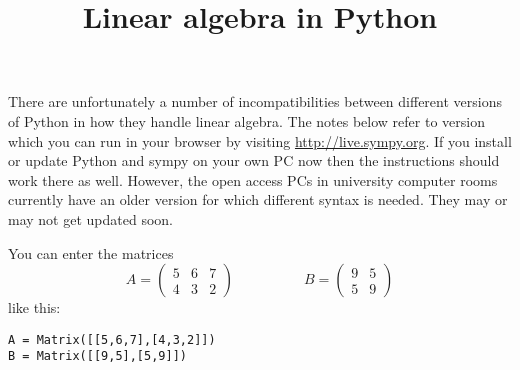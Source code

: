 \documentclass{amsart}
\title{Linear algebra in Python}
\begin{document}
\maketitle

There are unfortunately a number of incompatibilities between
different versions of Python  in how they handle linear algebra.  The
notes below refer to version which you can run in your browser by
visiting \url{http://live.sympy.org}.  If you install or update Python
and sympy on your own PC now then the instructions should work there
as well.  However, the open access PCs in university computer rooms
currently have an older version for which different syntax is needed.
They may or may not get updated soon.

You can enter the matrices 
\[ A = 
   \begin{pmatrix}
    5 & 6 & 7 \\
    4 & 3 & 2 
   \end{pmatrix}
   \hspace{5em}
   B = 
    \begin{pmatrix}
     9 & 5 \\ 5 & 9
    \end{pmatrix}
\]
like this:
\begin{verbatim}
A = Matrix([[5,6,7],[4,3,2]])
B = Matrix([[9,5],[5,9]])
\end{verbatim}
\end{document}
